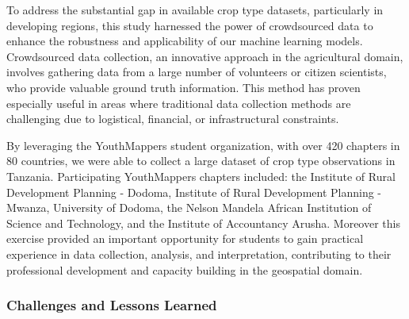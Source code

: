 \documentclass[
  journal,
  twocolumn]{IEEEtran}
\begin{document}
To address the substantial gap in available crop type datasets,
particularly in developing regions, this study harnessed the power of
crowdsourced data to enhance the robustness and applicability of our
machine learning models. Crowdsourced data collection, an innovative
approach in the agricultural domain, involves gathering data from a
large number of volunteers or citizen scientists, who provide valuable
ground truth information. This method has proven especially useful in
areas where traditional data collection methods are challenging due to
logistical, financial, or infrastructural constraints.

By leveraging the YouthMappers student organization, with over 420
chapters in 80 countries, we were able to collect a large dataset of
crop type observations in Tanzania. Participating YouthMappers chapters
included: the Institute of Rural Development Planning - Dodoma,
Institute of Rural Development Planning - Mwanza, University of Dodoma,
the Nelson Mandela African Institution of Science and Technology, and
the Institute of Accountancy Arusha. Moreover this exercise provided an
important opportunity for students to gain practical experience in data
collection, analysis, and interpretation, contributing to their
professional development and capacity building in the geospatial domain.

\hypertarget{challenges-and-lessons-learned}{%
\subsubsection{Challenges and Lessons
Learned}\label{challenges-and-lessons-learned}}
\end{document}
